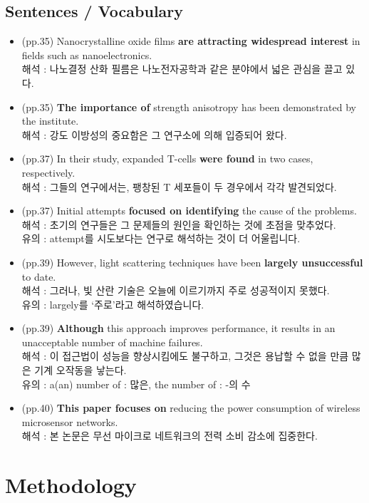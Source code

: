 \documentclass[10pt]{report}
\begin{document}
	\section{Sentences / Vocabulary}
	\begin{itemize}
		\item (pp.35) Nanocrystalline oxide films {\bf are attracting widespread interest} in fields such as nanoelectronics.\\
		해석 : 나노결정 산화 필름은 나노전자공학과 같은 분야에서 넓은 관심을 끌고 있다.
		\item (pp.35) {\bf The importance of} strength anisotropy has been demonstrated by the institute.\\
		해석 : 강도 이방성의 중요함은 그 연구소에 의해 입증되어 왔다.
		\item (pp.37) In their study, expanded T-cells {\bf were found} in two cases, respectively.\\
		해석 : 그들의 연구에서는, 팽창된 T 세포들이 두 경우에서 각각 발견되었다.
		\item (pp.37) Initial attempts {\bf focused on identifying} the cause of the problems.\\
		해석 : 초기의 연구들은 그 문제들의 원인을 확인하는 것에 초점을 맞추었다. \\
		유의 : attempt를 시도보다는 연구로 해석하는 것이 더 어울립니다.
		\item (pp.39) However, light scattering techniques have been {\bf largely unsuccessful} to date.\\
		해석 : 그러나, 빛 산란 기술은 오늘에 이르기까지 주로 성공적이지 못했다. \\
		유의 : largely를 `주로'라고 해석하였습니다.
		\item (pp.39) {\bf Although} this approach improves performance, it results in an unacceptable number of machine failures.\\
		해석 : 이 접근법이 성능을 향상시킴에도 불구하고, 그것은 용납할 수 없을 만큼 많은 기계 오작동을 낳는다.\\
		유의 : a(an) number of : 많은, the number of : -의 수
		\item (pp.40) {\bf This paper focuses on} reducing the power consumption of wireless microsensor networks. \\
		해석 : 본 논문은 무선 마이크로 네트워크의 전력 소비 감소에 집중한다.
	\end{itemize}
	\chapter{Methodology}
	
\end{document}
